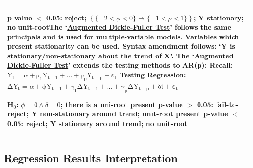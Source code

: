 \documentclass[11pt, english]{article}
\begin{document}
\begin{center}
\begin{longtable}{p{14cm}}
                p-value $<$ 0.05: reject; $\left\{\{-2<\phi<0\}\Rightarrow\{-1<\rho<1\}\right\}$; Y stationary; no unit-root\newline\newline
                [8.2] The `\underline{Augmented Dickie-Fuller Test}' follows the same principals and is used for multiple-variable models. Variables which present stationarity can be used. Syntax amendment follows: `Y is stationary/non-stationary about the trend of X’. The `\underline{Augmented Dickie-Fuller Test}' extends the testing methods to AR(p):\newline\newline
		Recall: $\mathrm{Y_t=\alpha+\rho_1Y_{t-1}+...+\rho_pY_{t-p}+\varepsilon_t}$\newline
                Testing Regression: $\mathrm{\Delta Y_t=\alpha+\phi Y_{t-1}+\gamma_1\Delta Y_{t-1}+...+\gamma_p\Delta Y_{t-p}+\delta t+\varepsilon_t}$\newline

                H$_0$: $\phi=0\land\delta=0$; there is a uni-root present\newline\newline
                p-value $>$ 0.05: fail-to-reject; Y non-stationary around trend; unit-root present\newline
                p-value $<$ 0.05: reject; Y stationary around trend; no unit-root\\
                \hline
        \end{longtable} 
        \end{center}

	\newpage

	\subsection{Regression Results Interpretation}
\end{document}
